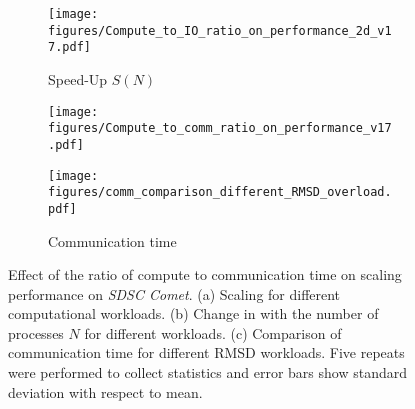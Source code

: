 \begin{figure}[!htb]
  \centering
  \begin{subfigure} {.31\textwidth}
    \texttt{[image: figures/Compute\_to\_IO\_ratio\_on\_performance\_2d\_v17.pdf]}
    \caption{Speed-Up $S(N)$}
    \label{fig:S1_tcomp_tcomm_effect}
  \end{subfigure}
  \hfill
  \begin{subfigure}{.3\textwidth}
    \texttt{[image: figures/Compute\_to\_comm\_ratio\_on\_performance\_v17.pdf]}
    \captionsetup{format=hang}
    \caption{\Rcompcomm}
    \label{fig:tcomp_tcomm_ratio}
  \end{subfigure}
  \hfill
  \begin{subfigure}{.31\textwidth}
    \texttt{[image: figures/comm\_comparison\_different\_RMSD\_overload.pdf]}
    \caption{Communication time \tcomm}
    \label{fig:Comm_time_tcomp_tcomm_effect}
  \end{subfigure}
  \caption{Effect of the ratio of compute to communication time \Rcompcomm on scaling performance on \emph{SDSC Comet}.
    (a) Scaling for different computational workloads.
    (b) Change in \Rcompcomm with the number of processes $N$ for different workloads. 
    (c) Comparison of communication time for different RMSD workloads.
    Five repeats were performed to collect statistics and error bars show standard deviation with respect to mean.}
  \label{fig:tcom_tcomm_effect}
\end{figure}

